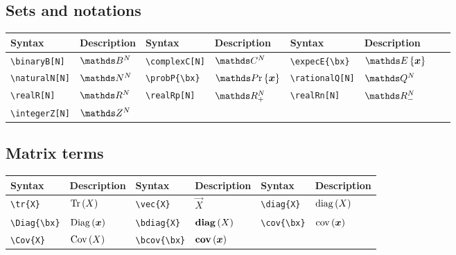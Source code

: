 \documentclass{article}
\begin{document}
	\subsection{Sets and notations}
	\begin{table}[H]
		\begin{tabular}{|l|l|l|l|l|l|l|l|}
			\hline
			Syntax	&	Description	&	Syntax	&	Description	&	Syntax	&	Description \\
			\hline
			\verb|\binaryB[N]|	&	$\binaryB[N]$	&	\verb|\complexC[N]|	&	$\complexC[N]$	&	\verb|\expecE{\bx}|	&	$\expecE{\bx}$\\
			\verb|\naturalN[N]|	&	$\naturalN[N]$	&	\verb|\probP{\bx}|	&	$\probP{\bx}$	&	\verb|\rationalQ[N]|	&	$\rationalQ[N]$\\
			\verb|\realR[N]|	&	$\realR[N]$	&	\verb|\realRp[N]|	&	$\realRp[N]$	&	\verb|\realRn[N]|	&	$\realRn[N]$\\
			\verb|\integerZ[N]|	&	$\integerZ[N]$	&		&		&		&	\\
			\hline	
		\end{tabular}
	\end{table}

	\subsection{Matrix terms}
	\begin{table}[H]
		\begin{tabular}{|l|l|l|l|l|l|}
			\hline
			Syntax	&	Description	&	Syntax	&	Description	&	Syntax	&	Description	 \\
			\hline
			\verb|\tr{X}|	&	$\mathrm{Tr}\left(X\right)$	&	\verb|\vec{X}|	&	$\vec{X}$	&	\verb|\diag{X}|	&	$\mathrm{diag}\left(X\right)$ \\
			\verb|\Diag{\bx}|	&	$\mathrm{Diag}\left(\boldsymbol{x}\right)$	&	\verb|\bdiag{X}|	&	$\mathbf{diag}\left(X\right)$	&	\verb|\cov{\bx}|	&	$\mathrm{cov}\left(\boldsymbol{x}\right)$ \\
			\verb|\Cov{X}|	&	$\mathrm{Cov}\left(X\right)$	&	\verb|\bcov{\bx}|	&	$\mathbf{cov}\left(\boldsymbol{x}\right)$ &	&	\\
			\hline	
		\end{tabular}
	\end{table}
\end{document}
